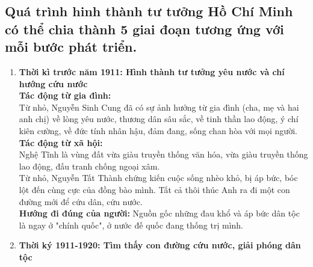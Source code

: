 \documentclass{article}
\begin{document}
	\subsection{Quá trình hinh thành tư tưởng Hồ Chí Minh có thể chia thành 5 giai đoạn tương ứng với mỗi bước phát triển.}
	\begin{enumerate}
		\item \textbf{Thời kì trước năm 1911: Hình thành tư tưởng yêu nước và chí hướng cứu nước}\\

		\textbf{Tác động từ gia đình:}\\
		Từ nhỏ, Nguyễn Sinh Cung đã có sự ảnh hưởng từ gia đình (cha, mẹ và hai anh chị) về lòng yêu nước, thương dân sâu sắc, về tinh thần lao động, ý chí kiên cường, về đức tính nhân hậu, đảm đang, sống chan hòa với mọi người.\\
		\textbf{Tác động từ xã hội:}\\
		Nghệ Tĩnh là vùng đất vừa giàu truyền thống văn hóa, vừa giàu truyền thống lao động, đấu tranh chống ngoại xâm.\\
		Từ nhỏ, Nguyễn Tất Thành chứng kiến cuộc sống nhèo khỏ, bị áp bức, bóc lột đến cùng cực của đồng bào mình. Tất cả thôi thúc Anh ra đi một con đường mới để cứu dân, cứu nước.\\
		\textbf{Hướng đi đúng của người:} Nguồn gốc những đau khổ và áp bức dân tộc là ngay ở "chính quốc", ở nước đế quốc đang thống trị mình.
		\item \textbf{Thời ký 1911-1920: Tìm thấy con đường cứu nước, giải phóng dân tộc}\\


\end{enumerate}
\end{document}
